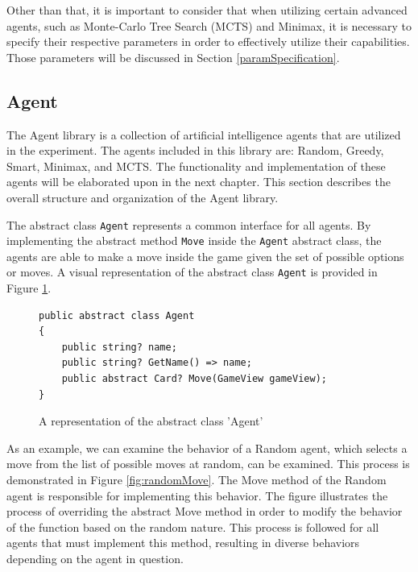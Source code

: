 Other than that, it is important to consider that when utilizing certain advanced agents, such as Monte-Carlo Tree Search (MCTS) and Minimax, it is necessary to specify their respective parameters in order to effectively utilize their capabilities. Those parameters will be discussed in Section \ref{paramSpecification}.

\subsection{Agent}

The Agent library is a collection of artificial intelligence agents that are utilized in the experiment. The agents included in this library are: Random, Greedy, Smart, Minimax, and MCTS. The functionality and implementation of these agents will be elaborated upon in the next chapter. This section describes the overall structure and organization of the Agent library.

The abstract class \texttt{Agent} represents a common interface for all agents. By implementing the abstract method \texttt{Move} inside the \texttt{Agent} abstract class, the agents are able to make a move inside the game given the set of possible options or moves. A visual representation of the abstract class \texttt{Agent} is provided in Figure \ref{fig:abstractClass}.

\begin{figure}[h]
\captionsetup{justification=centering}
\begin{lstlisting}
public abstract class Agent
{
    public string? name;
    public string? GetName() => name;
    public abstract Card? Move(GameView gameView);
}
\end{lstlisting}
\caption{A representation of the abstract class 'Agent'}
\label{fig:abstractClass}
\end{figure}

As an example, we can examine the behavior of a Random agent, which selects a move from the list of possible moves at random, can be examined. This process is demonstrated in Figure \ref{fig:randomMove}. The Move method of the Random agent is responsible for implementing this behavior. The figure illustrates the process of overriding the abstract Move method in order to modify the behavior of the function based on the random nature. This process is followed for all agents that must implement this method, resulting in diverse behaviors depending on the agent in question.
